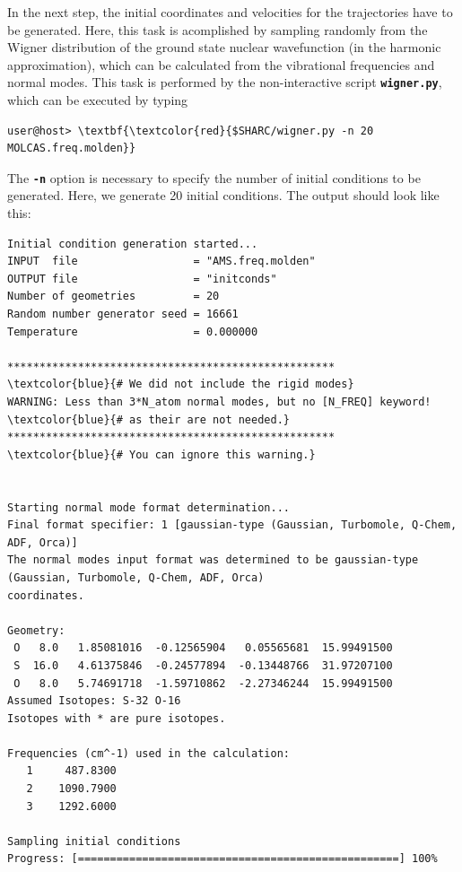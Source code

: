 \documentclass[a4paper,11pt,DIV=15,openany]{scrbook}
\newcommand{\ttt}[1]{\textbf{\texttt{#1}}}
\begin{document}
In the next step, the initial coordinates and velocities for the trajectories have to be generated.
Here, this task is acomplished by sampling randomly from the Wigner distribution of the ground state nuclear wavefunction (in the harmonic approximation), which can be calculated from the vibrational frequencies and normal modes.
This task is performed by the non-interactive script \ttt{wigner.py}, which can be executed by typing
\begin{Verbatim}[commandchars=\\\{\}]
user@host> \textbf{\textcolor{red}{$SHARC/wigner.py -n 20 MOLCAS.freq.molden}}
\end{Verbatim}
The \ttt{-n} option is necessary to specify the number of initial conditions to be generated. 
Here, we generate 20 initial conditions. 
The output should look like this:
\begin{oframed}
\footnotesize\begin{Verbatim}[commandchars=\\\{\}]
Initial condition generation started...
INPUT  file                  = "AMS.freq.molden"
OUTPUT file                  = "initconds"
Number of geometries         = 20
Random number generator seed = 16661
Temperature                  = 0.000000

***************************************************                 \textcolor{blue}{# We did not include the rigid modes}
WARNING: Less than 3*N_atom normal modes, but no [N_FREQ] keyword!  \textcolor{blue}{# as their are not needed.} 
***************************************************                 \textcolor{blue}{# You can ignore this warning.}


Starting normal mode format determination...
Final format specifier: 1 [gaussian-type (Gaussian, Turbomole, Q-Chem, ADF, Orca)]
The normal modes input format was determined to be gaussian-type (Gaussian, Turbomole, Q-Chem, ADF, Orca) 
coordinates.

Geometry:
 O   8.0   1.85081016  -0.12565904   0.05565681  15.99491500 
 S  16.0   4.61375846  -0.24577894  -0.13448766  31.97207100 
 O   8.0   5.74691718  -1.59710862  -2.27346244  15.99491500 
Assumed Isotopes: S-32 O-16 
Isotopes with * are pure isotopes.

Frequencies (cm^-1) used in the calculation:
   1     487.8300
   2    1090.7900
   3    1292.6000

Sampling initial conditions
Progress: [==================================================] 100%
\end{Verbatim}
\end{oframed}
\normalsize
\end{document}
